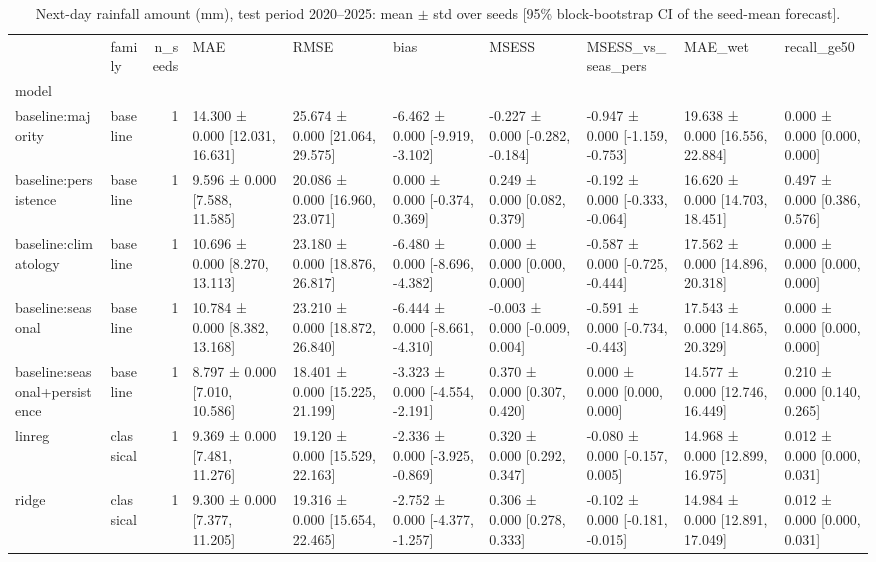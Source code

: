 \begin{table}
\caption{Next-day rainfall amount (mm), test period 2020--2025: mean $\pm$ std over seeds [95\% block-bootstrap CI of the seed-mean forecast].}
\label{tab:test_reg}
\begin{tabular}{llrlllllll}
\toprule
 & family & n\_seeds & MAE & RMSE & bias & MSESS & MSESS\_vs\_seas\_pers & MAE\_wet & recall\_ge50 \\
model &  &  &  &  &  &  &  &  &  \\
\midrule
baseline:majority & baseline & 1 & 14.300 ± 0.000 [12.031, 16.631] & 25.674 ± 0.000 [21.064, 29.575] & -6.462 ± 0.000 [-9.919, -3.102] & -0.227 ± 0.000 [-0.282, -0.184] & -0.947 ± 0.000 [-1.159, -0.753] & 19.638 ± 0.000 [16.556, 22.884] & 0.000 ± 0.000 [0.000, 0.000] \\
baseline:persistence & baseline & 1 & 9.596 ± 0.000 [7.588, 11.585] & 20.086 ± 0.000 [16.960, 23.071] & 0.000 ± 0.000 [-0.374, 0.369] & 0.249 ± 0.000 [0.082, 0.379] & -0.192 ± 0.000 [-0.333, -0.064] & 16.620 ± 0.000 [14.703, 18.451] & 0.497 ± 0.000 [0.386, 0.576] \\
baseline:climatology & baseline & 1 & 10.696 ± 0.000 [8.270, 13.113] & 23.180 ± 0.000 [18.876, 26.817] & -6.480 ± 0.000 [-8.696, -4.382] & 0.000 ± 0.000 [0.000, 0.000] & -0.587 ± 0.000 [-0.725, -0.444] & 17.562 ± 0.000 [14.896, 20.318] & 0.000 ± 0.000 [0.000, 0.000] \\
baseline:seasonal & baseline & 1 & 10.784 ± 0.000 [8.382, 13.168] & 23.210 ± 0.000 [18.872, 26.840] & -6.444 ± 0.000 [-8.661, -4.310] & -0.003 ± 0.000 [-0.009, 0.004] & -0.591 ± 0.000 [-0.734, -0.443] & 17.543 ± 0.000 [14.865, 20.329] & 0.000 ± 0.000 [0.000, 0.000] \\
baseline:seasonal+persistence & baseline & 1 & 8.797 ± 0.000 [7.010, 10.586] & 18.401 ± 0.000 [15.225, 21.199] & -3.323 ± 0.000 [-4.554, -2.191] & 0.370 ± 0.000 [0.307, 0.420] & 0.000 ± 0.000 [0.000, 0.000] & 14.577 ± 0.000 [12.746, 16.449] & 0.210 ± 0.000 [0.140, 0.265] \\
linreg & classical & 1 & 9.369 ± 0.000 [7.481, 11.276] & 19.120 ± 0.000 [15.529, 22.163] & -2.336 ± 0.000 [-3.925, -0.869] & 0.320 ± 0.000 [0.292, 0.347] & -0.080 ± 0.000 [-0.157, 0.005] & 14.968 ± 0.000 [12.899, 16.975] & 0.012 ± 0.000 [0.000, 0.031] \\
ridge & classical & 1 & 9.300 ± 0.000 [7.377, 11.205] & 19.316 ± 0.000 [15.654, 22.465] & -2.752 ± 0.000 [-4.377, -1.257] & 0.306 ± 0.000 [0.278, 0.333] & -0.102 ± 0.000 [-0.181, -0.015] & 14.984 ± 0.000 [12.891, 17.049] & 0.012 ± 0.000 [0.000, 0.031] \\

\end{tabular}
\end{table}
